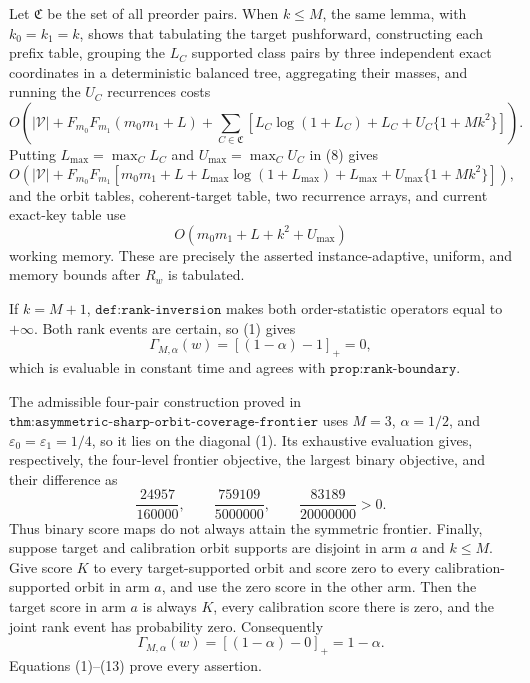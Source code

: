 Let \(\mathfrak C\) be the set of all preorder pairs. When \(k\le M\), the same lemma, with \(k_0=k_1=k\), shows that tabulating the target pushforward, constructing each prefix table, grouping the \(L_C\) supported class pairs by three independent exact coordinates in a deterministic balanced tree, aggregating their masses, and running the \(U_C\) recurrences costs
\[
O\!\left(
|\mathcal V|+F_{m_0}F_{m_1}(m_0m_1+L)+\sum_{C\in\mathfrak C}\left[L_C\log(1+L_C)+L_C+U_C\{1+Mk^2\}\right]
\right). \tag{8}
\]
Putting \(L_{\max}=\max_C L_C\) and \(U_{\max}=\max_C U_C\) in (8) gives
\[
O\!\left(|\mathcal V|+F_{m_0}F_{m_1}\left[m_0m_1+L+L_{\max}\log(1+L_{\max})+L_{\max}+U_{\max}\{1+Mk^2\}\right]\right), \tag{9}
\]
and the orbit tables, coherent-target table, two recurrence arrays, and current exact-key table use
\[
O(m_0m_1+L+k^2+U_{\max}) \tag{10}
\]
working memory. These are precisely the asserted instance-adaptive, uniform, and memory bounds after \(R_w\) is tabulated.

If \(k=M+1\), \(\texttt{def:rank-inversion}\) makes both order-statistic operators equal to \(+\infty\). Both rank events are certain, so (1) gives
\[
\Gamma_{M,\alpha}(w)=[(1-\alpha)-1]_+=0, \tag{11}
\]
which is evaluable in constant time and agrees with \(\texttt{prop:rank-boundary}\).

The admissible four-pair construction proved in \(\texttt{thm:asymmetric-sharp-orbit-coverage-frontier}\) uses \(M=3\), \(\alpha=1/2\), and \(\varepsilon_0=\varepsilon_1=1/4\), so it lies on the diagonal (1). Its exhaustive evaluation gives, respectively, the four-level frontier objective, the largest binary objective, and their difference as
\[
\frac{24957}{160000},\qquad \frac{759109}{5000000},\qquad \frac{83189}{20000000}>0. \tag{12}
\]
Thus binary score maps do not always attain the symmetric frontier. Finally, suppose target and calibration orbit supports are disjoint in arm \(a\) and \(k\le M\). Give score \(K\) to every target-supported orbit and score zero to every calibration-supported orbit in arm \(a\), and use the zero score in the other arm. Then the target score in arm \(a\) is always \(K\), every calibration score there is zero, and the joint rank event has probability zero. Consequently
\[
\Gamma_{M,\alpha}(w)=[(1-\alpha)-0]_+=1-\alpha. \tag{13}
\]
Equations (1)--(13) prove every assertion.